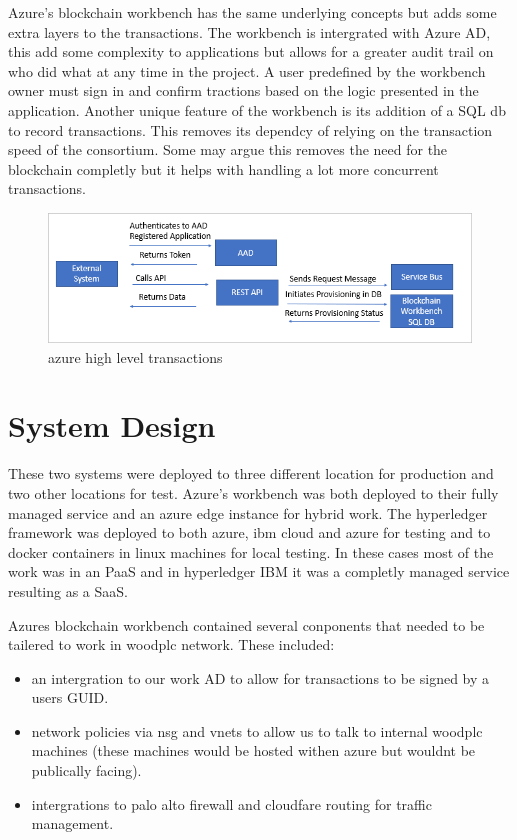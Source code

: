 \documentclass[runningheads]{llncs}
\begin{document}
Azure's blockchain workbench has the same underlying concepts but adds some extra layers to the transactions. The workbench is intergrated with Azure AD, this add some complexity to applications but allows for a greater audit trail on who did what at any time in the project. A user predefined by the workbench owner must sign in and confirm tractions based on the logic presented in the application.
Another unique feature of the workbench is its addition of a SQL db to record transactions. This removes its dependcy of relying on the transaction speed of the consortium. Some may argue this removes the need for the blockchain completly but it helps with handling a lot more concurrent transactions.

\begin{figure}
	\center
	\includegraphics[width=1.0\textwidth]{transactions-ledger.png}
	\caption{azure high level transactions}
	\label{fig:conversion}
\end{figure}

\section{System Design}
These two systems were deployed to three different location for production and two other locations for test. Azure's workbench was both deployed to their fully managed service and an azure edge instance for hybrid work. The hyperledger framework was deployed to both azure, ibm cloud and azure for testing and to docker containers in linux machines for local testing. In these cases most of the work was in an PaaS and in hyperledger IBM it was a completly managed service resulting as a SaaS. 

Azures blockchain workbench contained several conponents that needed to be tailered to work in woodplc network. These included:
\begin{itemize}
	\item an intergration to our work AD to allow for transactions to be signed by a users GUID.
	\item network policies via nsg and vnets to allow us to talk to internal woodplc machines (these machines would be hosted withen azure but wouldnt be publically facing).
	\item intergrations to palo alto firewall and cloudfare routing for traffic management.
\end{itemize}
\end{document}
